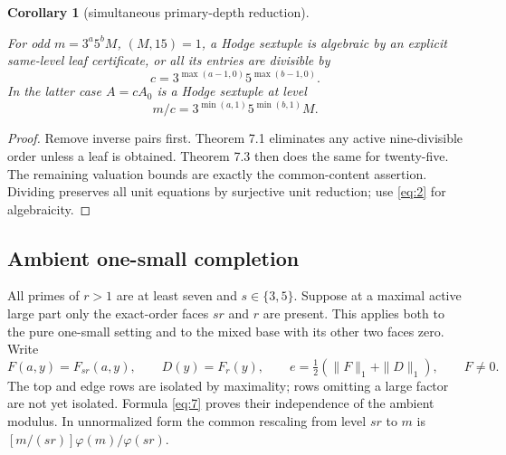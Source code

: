 \documentclass[11pt]{amsart}
\numberwithin{theorem}{section}
\newtheorem{corollary}[theorem]{Corollary}
\theoremstyle{remark}
\numberwithin{equation}{section}
\begin{document}
\begin{corollary}[simultaneous primary-depth reduction]\label{corollary:7.4}

For odd \(m=3^a5^bM\), \((M,15)=1\), a Hodge sextuple is algebraic by
an explicit same-level leaf certificate, or all its entries are divisible by
\[
c=3^{\max(a-1,0)}5^{\max(b-1,0)}.
\]
In the latter case \(A=cA_0\) is a Hodge sextuple at level
\[
m/c=3^{\min(a,1)}5^{\min(b,1)}M.
\]

\end{corollary}
\begin{proof}

Remove inverse pairs first. Theorem 7.1 eliminates any active
nine-divisible order unless a leaf is obtained. Theorem 7.3 then does the
same for twenty-five. The remaining valuation bounds are exactly the
common-content assertion. Dividing preserves all unit equations by
surjective unit reduction; use \eqref{eq:2} for algebraicity.
\end{proof}

\subsection{Ambient one-small completion}\label{sec:7.3}

All primes of \(r>1\) are at least seven and \(s\in\{3,5\}\).
Suppose at a maximal active large part only the exact-order faces
\(sr\) and \(r\) are present. This applies both to the pure one-small
setting and to the mixed base with its other two faces zero. Write
\[
F(a,y)=F_{sr}(a,y),\qquad D(y)=F_r(y),\qquad
e=\tfrac12(\|F\|_1+\|D\|_1),\qquad F\ne0.
\]
The top and edge rows are isolated by maximality; rows omitting a large
factor are not yet isolated. Formula \eqref{eq:7} proves their independence of
the ambient modulus. In unnormalized form the common rescaling from
level \(sr\) to \(m\) is \([m/(sr)]\varphi(m)/\varphi(sr)\).
\end{document}
